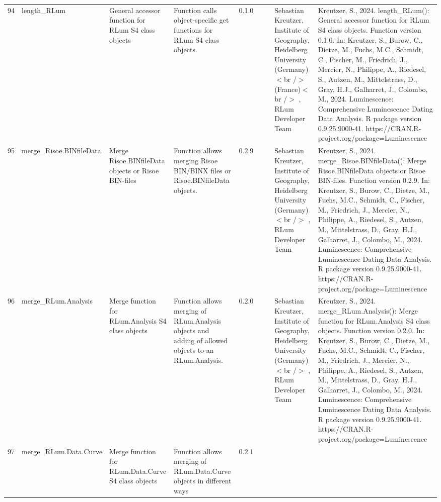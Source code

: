 \begin{table}[ht]
\begin{tabular}{rllllllll}
  94 & length\_RLum & General accessor function for RLum S4 class objects & Function calls object-specific get functions for RLum S4 class objects. & 0.1.0
 &  &  & Sebastian Kreutzer, Institute of Geography, Heidelberg University (Germany)$<$br /$>$ (France)$<$br /$>$ , RLum Developer Team & Kreutzer, S., 2024. length\_RLum(): General accessor function for RLum S4 class objects. Function version 0.1.0. In: Kreutzer, S., Burow, C., Dietze, M., Fuchs, M.C., Schmidt, C., Fischer, M., Friedrich, J., Mercier, N., Philippe, A., Riedesel, S., Autzen, M., Mittelstrass, D., Gray, H.J., Galharret, J., Colombo, M., 2024. Luminescence: Comprehensive Luminescence Dating Data Analysis. R package version 0.9.25.9000-41. https://CRAN.R-project.org/package=Luminescence
 \\ 
  95 & merge\_Risoe.BINfileData & Merge Risoe.BINfileData objects or Risoe BIN-files & Function allows merging Risoe BIN/BINX files or  Risoe.BINfileData  objects. & 0.2.9
 &  &  & Sebastian Kreutzer, Institute of Geography, Heidelberg University (Germany)$<$br /$>$ , RLum Developer Team & Kreutzer, S., 2024. merge\_Risoe.BINfileData(): Merge Risoe.BINfileData objects or Risoe BIN-files. Function version 0.2.9. In: Kreutzer, S., Burow, C., Dietze, M., Fuchs, M.C., Schmidt, C., Fischer, M., Friedrich, J., Mercier, N., Philippe, A., Riedesel, S., Autzen, M., Mittelstrass, D., Gray, H.J., Galharret, J., Colombo, M., 2024. Luminescence: Comprehensive Luminescence Dating Data Analysis. R package version 0.9.25.9000-41. https://CRAN.R-project.org/package=Luminescence
 \\ 
  96 & merge\_RLum.Analysis & Merge function for RLum.Analysis S4 class objects & Function allows merging of RLum.Analysis objects and adding of allowed objects to an RLum.Analysis. & 0.2.0
 &  &  & Sebastian Kreutzer, Institute of Geography, Heidelberg University (Germany)$<$br /$>$ , RLum Developer Team & Kreutzer, S., 2024. merge\_RLum.Analysis(): Merge function for RLum.Analysis S4 class objects. Function version 0.2.0. In: Kreutzer, S., Burow, C., Dietze, M., Fuchs, M.C., Schmidt, C., Fischer, M., Friedrich, J., Mercier, N., Philippe, A., Riedesel, S., Autzen, M., Mittelstrass, D., Gray, H.J., Galharret, J., Colombo, M., 2024. Luminescence: Comprehensive Luminescence Dating Data Analysis. R package version 0.9.25.9000-41. https://CRAN.R-project.org/package=Luminescence
 \\ 
  97 & merge\_RLum.Data.Curve & Merge function for RLum.Data.Curve S4 class objects & Function allows merging of RLum.Data.Curve objects in different ways & 0.2.1

\end{tabular}
\end{table}
